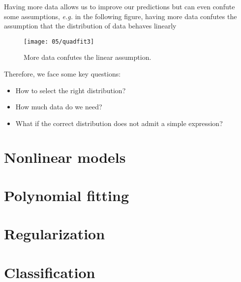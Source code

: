 Having more data allows us to improve our predictions but can even confute some assumptions, \textit{e.g.} in the following figure, having more data confutes the assumption that the distribution of data behaves linearly
\begin{figure}[H]
	\centering
	\texttt{[image: 05/quadfit3]}
	\caption{More data confutes the linear assumption.}\label{fig:conf_assump}	
\end{figure}

Therefore, we face some key questions:
\begin{itemize}
	\item How to select the right distribution?
	\item How much data do we need?
	\item What if the correct distribution does not admit a simple expression?
\end{itemize}

\section{Nonlinear models} 

\section{Polynomial fitting} 

\section{Regularization} 

\section{Classification} 

